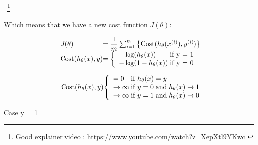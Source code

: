 ~\footnote{ Good explainer video : 
\href{ https://www.youtube.com/watch?v=XepXtl9YKwc }{https://www.youtube.com/watch?v=XepXtl9YKwc }
}



Which means that we have a new cost function $J(\theta)$:


\[
	\begin{array}{ l@{} l@{} }
	J(\theta)
	& =
	\dfrac{1}{m}
	\sum_{i=1}^m
	\left\{
		\mathrm{Cost}(h_\theta(x^{(i)}),y^{(i)})
	\right\}
	\\
	\mathrm{Cost}(h_\theta(x),y)
	& =
	\left\{
		\begin{array}{ l@{} l@{} } 
			-\log(h_\theta(x))
			\;
			& \text{if y = 1} 
			\\ 
			-\log(1-h_\theta(x))
			\;
			& \text{if y = 0} 
		\end{array}
	\right.  
	\end{array}
\]

\[
	\begin{array}{ l@{} l@{} }
		\mathrm{Cost}(h_\theta(x),y)
		&
		\left\{
		\begin{array}{ l@{} l@{} l@{} }
			& = 0
			& \text{ if } h_\theta(x) = y
			\\
			& \rightarrow \infty
			&\text{ if } y = 0
			\; \mathrm{and} \;
			h_\theta(x) \rightarrow 1
			\\
			& \rightarrow \infty
			& \text{ if } y = 1
			\; \mathrm{and} \;
			h_\theta(x) \rightarrow 0
			\\
		\end{array}
	\right.
	\end{array}
\]


	Case y = 1

	

